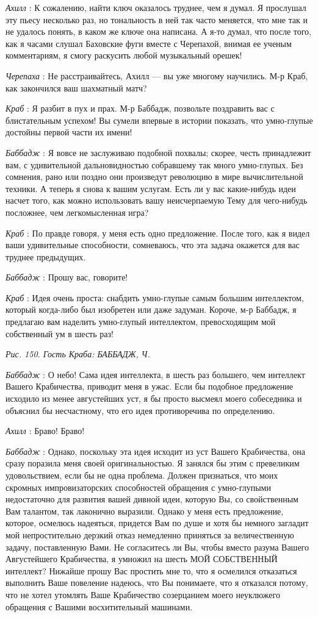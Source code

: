 \emph{Ахилл} : К сожалению, найти ключ оказалось труднее, чем я думал. Я прослушал эту пьесу несколько раз, но тональность в ней так часто меняется, что мне так и не удалось понять, в каком же ключе она написана. А я-то думал, что после того, как я часами слушал Баховские фуги вместе с Черепахой, внимая ее ученым комментариям, я смогу раскусить любой музыкальный орешек!

\emph{Черепаха} : Не расстраивайтесь, Ахилл --- вы уже многому научились. М-р Краб, как закончился ваш шахматный матч?

\emph{Краб} : Я разбит в пух и прах. М-р Баббадж, позвольте поздравить вас с блистательным успехом! Вы сумели впервые в истории показать, что умно-глупые достойны первой части их имени!

\emph{Баббадж} : Я вовсе не заслуживаю подобной похвалы; скорее, честь принадлежит вам, с удивительной дальновидностью собравшему так много умно-глупых. Без сомнения, рано или поздно они произведут революцию в мире вычислительной техники. А теперь я снова к вашим услугам. Есть ли у вас какие-нибудь идеи насчет того, как можно использовать вашу неисчерпаемую Тему для чего-нибудь посложнее, чем легкомысленная игра?

\emph{Краб} : По правде говоря, у меня есть одно предложение. После того, как я видел ваши удивительные способности, сомневаюсь, что эта задача окажется для вас труднее предыдущих.

\emph{Баббадж} : Прошу вас, говорите!

\emph{Краб} : Идея очень проста: снабдить умно-глупые самым большим интеллектом, который когда-либо был изобретен или даже задуман. Короче, м-р Баббадж, я предлагаю вам наделить умно-глупый интеллектом, превосходящим мой собственный ум в шесть раз!

\emph{Рис. 150. Гость Краба: БАББАДЖ, Ч.}

\emph{Баббадж} : О небо! Сама идея интеллекта, в шесть раз большего, чем интеллект Вашего Крабичества, приводит меня в ужас. Если бы подобное предложение исходило из менее августейших уст, я бы просто высмеял моего собеседника и объяснил бы несчастному, что его идея противоречива по определению.

\emph{Ахилл} : Браво! Браво!

\emph{Баббадж} : Однако, поскольку эта идея исходит из уст Вашего Крабичества, она сразу поразила меня своей оригинальностью. Я занялся бы этим с превеликим удовольствием, если бы не одна проблема. Должен признаться, что моих скромных импровизаторских способностей обращения с умно-глупыми недостаточно для развития вашей дивной идеи, которую Вы, со свойственным Вам талантом, так лаконично выразили. Однако у меня есть предложение, которое, осмелюсь надеяться, придется Вам по душе и хотя бы немного загладит мой непростительно дерзкий отказ немедленно приняться за величественную задачу, поставленную Вами. Не согласитесь ли Вы, чтобы вместо разума Вашего Августейшего Крабичества, я умножил на шесть МОЙ СОБСТВЕННЫЙ интеллект? Нижайше прошу Вас простить мне то, что я осмелился отказаться выполнить Ваше повеление надеюсь, что Вы понимаете, что я отказался потому, что не хотел утомлять Ваше Крабичество созерцанием моего неуклюжего обращения с Вашими восхитительный машинами.

